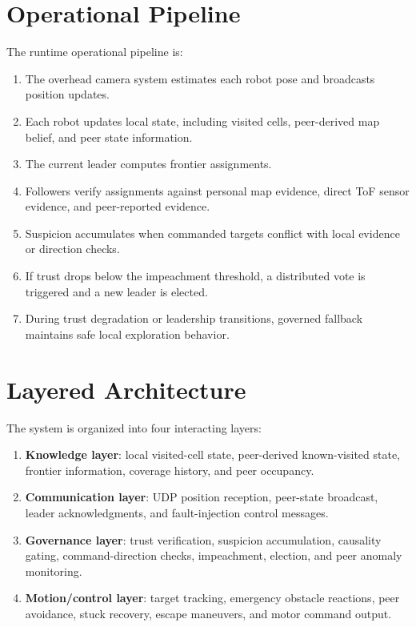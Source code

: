 \documentclass[a4paper,oneside,titlepage,11pt]{report}
\begin{document}
\section{Operational Pipeline}
The runtime operational pipeline is:
\begin{enumerate}
    \item The overhead camera system estimates each robot pose and broadcasts position updates.
    \item Each robot updates local state, including visited cells, peer-derived map belief, and peer state information.
    \item The current leader computes frontier assignments.
    \item Followers verify assignments against personal map evidence, direct ToF sensor evidence, and peer-reported evidence.
    \item Suspicion accumulates when commanded targets conflict with local evidence or direction checks.
    \item If trust drops below the impeachment threshold, a distributed vote is triggered and a new leader is elected.
    \item During trust degradation or leadership transitions, governed fallback maintains safe local exploration behavior.
\end{enumerate}

\section{Layered Architecture}
The system is organized into four interacting layers:
\begin{enumerate}
    \item \textbf{Knowledge layer}: local visited-cell state, peer-derived known-visited state, frontier information, coverage history, and peer occupancy.
    \item \textbf{Communication layer}: UDP position reception, peer-state broadcast, leader acknowledgments, and fault-injection control messages.
    \item \textbf{Governance layer}: trust verification, suspicion accumulation, causality gating, command-direction checks, impeachment, election, and peer anomaly monitoring.
    \item \textbf{Motion/control layer}: target tracking, emergency obstacle reactions, peer avoidance, stuck recovery, escape maneuvers, and motor command output.
\end{enumerate}
\end{document}
